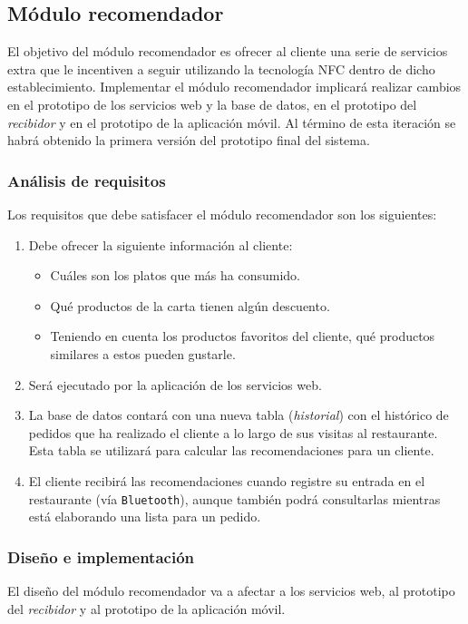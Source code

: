 \subsection{Módulo recomendador}
El objetivo del módulo recomendador es ofrecer al cliente una serie de
servicios extra que le incentiven a seguir utilizando la tecnología \acs{NFC}
dentro de dicho establecimiento. Implementar el módulo recomendador implicará
realizar cambios en el prototipo de los servicios web y la base de datos, en
el prototipo del \emph{recibidor} y en el prototipo de la aplicación móvil.
Al término de esta iteración se habrá obtenido la primera versión del prototipo
final del sistema.

\subsubsection{Análisis de requisitos}
Los requisitos que debe satisfacer el módulo recomendador son los siguientes:
\begin{enumerate}
\item Debe ofrecer la siguiente información al cliente:
  \begin{itemize}
  \item Cuáles son los platos que más ha consumido.
  \item Qué productos de la carta tienen algún descuento.
  \item Teniendo en cuenta los productos favoritos del cliente, qué productos
  similares a estos pueden gustarle.
  \end{itemize}
\item Será ejecutado por la aplicación de los servicios web.
\item La base de datos contará con una nueva tabla (\emph{historial}) con el
histórico de pedidos que ha realizado el cliente a lo largo de sus visitas
al restaurante. Esta tabla se utilizará para calcular las recomendaciones para
un cliente.
\item El cliente recibirá las recomendaciones cuando registre su entrada en el
restaurante (vía \texttt{Bluetooth}), aunque también podrá consultarlas mientras
está elaborando una lista para un pedido.
\end{enumerate}

\subsubsection{Diseño e implementación}
El diseño del módulo recomendador va a afectar a los servicios web, al 
prototipo del \emph{recibidor} y al prototipo de la aplicación móvil.

